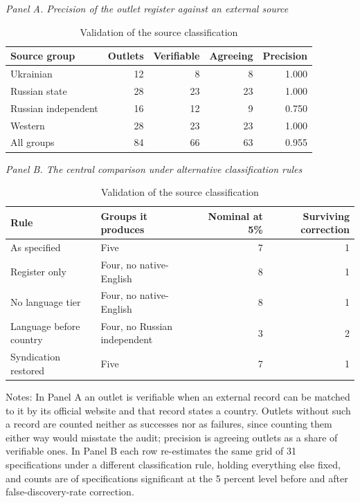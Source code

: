 \documentclass[12pt,a4paper]{article}
\begin{document}
\begin{table}[H]
\centering
\caption{Validation of the source classification}
\label{tab:classification_validation}
\begin{threeparttable}

\footnotesize
\textit{Panel A. Precision of the outlet register against an external source}

\begin{tabular}{lrrrr}
\toprule
Source group & Outlets & Verifiable & Agreeing & Precision \\
\midrule
Ukrainian           & 12 &  8 &  8 & 1.000 \\
Russian state       & 28 & 23 & 23 & 1.000 \\
Russian independent & 16 & 12 &  9 & 0.750 \\
Western             & 28 & 23 & 23 & 1.000 \\
\midrule
All groups          & 84 & 66 & 63 & 0.955 \\
\bottomrule
\end{tabular}

\vspace{1em}
\textit{Panel B. The central comparison under alternative classification rules}

\begin{tabular}{llrr}
\toprule
Rule & Groups it produces & Nominal at 5\% & Surviving correction \\
\midrule
As specified            & Five                        & 7 & 1 \\
Register only           & Four, no native-English     & 8 & 1 \\
No language tier        & Four, no native-English     & 8 & 1 \\
Language before country & Four, no Russian independent & 3 & 2 \\
Syndication restored    & Five                        & 7 & 1 \\
\bottomrule
\end{tabular}

\begin{tablenotes}
\small
\item Notes: In Panel A an outlet is verifiable when an external record can be matched to it by its official website and that record states a country. Outlets without such a record are counted neither as successes nor as failures, since counting them either way would misstate the audit; precision is agreeing outlets as a share of verifiable ones. In Panel B each row re-estimates the same grid of 31 specifications under a different classification rule, holding everything else fixed, and counts are of specifications significant at the 5 percent level before and after false-discovery-rate correction.
\end{tablenotes}
\end{threeparttable}
\end{table}
\end{document}
